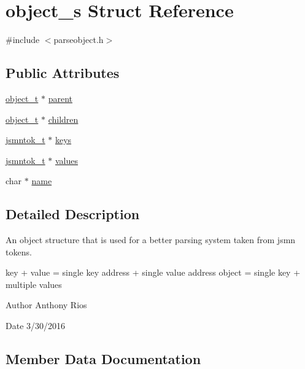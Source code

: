 \hypertarget{structobject__s}{}\section{object\+\_\+s Struct Reference}
\label{structobject__s}


{\ttfamily \#include $<$parseobject.\+h$>$}

\subsection*{Public Attributes}
\begin{DoxyCompactItemize}
\item 
\hyperlink{parseobject_8h_a965db53884ff9e4e077dd5e2e2d6a5e2}{object\+\_\+t} $\ast$ \hyperlink{structobject__s_af3fcd86c9b596d3d1380af38baf6e200}{parent}
\item 
\hyperlink{parseobject_8h_a965db53884ff9e4e077dd5e2e2d6a5e2}{object\+\_\+t} $\ast$ \hyperlink{structobject__s_ae161ef1b6dbb6ac83113daba113056d4}{children}
\item 
\hyperlink{structjsmntok__t}{jsmntok\+\_\+t} $\ast$ \hyperlink{structobject__s_ae41d32ca81f80b132fab77e1595b8562}{keys}
\item 
\hyperlink{structjsmntok__t}{jsmntok\+\_\+t} $\ast$ \hyperlink{structobject__s_a131fb4eda0dee00a634151e5d7f32184}{values}
\item 
char $\ast$ \hyperlink{structobject__s_a78e4044696254ef6eded9929ab36382c}{name}
\end{DoxyCompactItemize}


\subsection{Detailed Description}
An object structure that is used for a better parsing system taken from jsmn tokens.

key + value = single key address + single value address object = single key + multiple values

\begin{DoxyAuthor}{Author}
Anthony Rios 
\end{DoxyAuthor}
\begin{DoxyDate}{Date}
3/30/2016 
\end{DoxyDate}


\subsection{Member Data Documentation}
